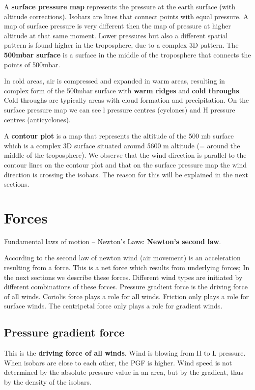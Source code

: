 \documentclass[oneside]{book}
\begin{document}
A \textbf{surface pressure map} represents the pressure at the earth
surface (with altitude corrections). Isobars are lines that connect
points with equal pressure. A map of surface pressure is very different
then the map of pressure at higher altitude at that same moment. Lower
pressures but also a different spatial pattern is found higher in the
troposphere, due to a complex 3D pattern. The \textbf{500mbar surface}
is a surface in the middle of the troposphere that connects the points
of 500mbar.

In cold areas, air is compressed and expanded in warm areas, resulting
in complex form of the 500mbar surface with \textbf{warm ridges} and
\textbf{cold throughs}. Cold throughs are typically areas with cloud
formation and precipitation. On the surface pressure map we can see l
pressure centres (cyclones) and H pressure centres (anticyclones).

A \textbf{contour plot} is a map that represents the altitude of the 500
mb surface which is a complex 3D surface situated around 5600 m altitude
(= around the middle of the troposphere). We observe that the wind
direction is parallel to the contour lines on the contour plot and that
on the surface pressure map the wind direction is crossing the isobars.
The reason for this will be explained in the next sections.

\section{Forces}\label{forces}

Fundamental laws of motion -- Newton's Laws: \textbf{Newton's second
law}.

According to the second law of newton wind (air movement) is an
acceleration resulting from a force. This is a net force which results
from underlying forces; In the next sections we describe these forces.
Different wind types are initiated by different combinations of these
forces. Pressure gradient force is the driving force of all winds.
Coriolis force plays a role for all winds. Friction only plays a role
for surface winds. The centripetal force only plays a role for gradient
winds.

\subsection{Pressure gradient force}\label{pressure-gradient-force}

This is the \textbf{driving force of all winds}. Wind is blowing from H
to L pressure. When isobars are close to each other, the PGF is higher.
Wind speed is not determined by the absolute pressure value in an area,
but by the gradient, thus by the density of the isobars.
\end{document}
